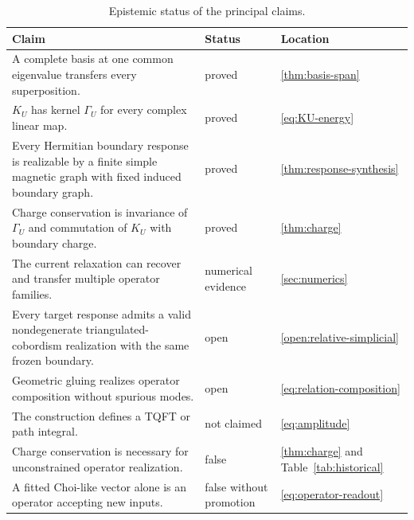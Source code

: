\documentclass[11pt]{article}
\numberwithin{equation}{section}
\theoremstyle{definition}
\theoremstyle{remark}
\begin{document}
\begin{table}[H]
  \centering
  \caption{Epistemic status of the principal claims.}
  \label{tab:claim-ledger}
  \begin{tabular}{>{\raggedright\arraybackslash}p{}
                  >{\raggedright\arraybackslash}p{}
                  >{\raggedright\arraybackslash}p{}}
    \toprule
    Claim & Status & Location\\
    \midrule
    A complete basis at one common eigenvalue transfers every superposition.
      & proved & \cref{thm:basis-span}\\
    $K_U$ has kernel $\Gamma_U$ for every complex linear map.
      & proved & \cref{eq:KU-energy}\\
    Every Hermitian boundary response is realizable by a finite simple magnetic
    graph with fixed induced boundary graph.
      & proved & \cref{thm:response-synthesis}\\
    Charge conservation is invariance of $\Gamma_U$ and commutation of $K_U$
    with boundary charge.
      & proved & \cref{thm:charge}\\
    The current relaxation can recover and transfer multiple operator families.
      & numerical evidence & \cref{sec:numerics}\\
    Every target response admits a valid nondegenerate triangulated-cobordism
    realization with the same frozen boundary.
      & open & \cref{open:relative-simplicial}\\
    Geometric gluing realizes operator composition without spurious modes.
      & open & \cref{eq:relation-composition}\\
    The construction defines a TQFT or path integral.
      & not claimed & \cref{eq:amplitude}\\
    Charge conservation is necessary for unconstrained operator realization.
      & false & \cref{thm:charge} and Table~\ref{tab:historical}\\
    A fitted Choi-like vector alone is an operator accepting new inputs.
      & false without promotion & \cref{eq:operator-readout}\\
    \bottomrule
  \end{tabular}
\end{table}
\end{document}
